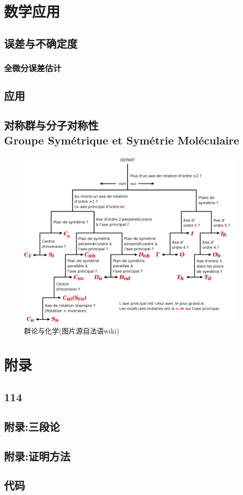\documentclass[12pt, a4paper, oneside]{ctexbook}
\begin{document}
  \part{数学应用}
  \chapter{误差与不确定度}
  \section{全微分误差估计}
  \chapter{应用}  
  \section{}
  \chapter{对称群与分子对称性\\ Groupe Symétrique et Symétrie Moléculaire}
  \begin{figure}[H]%
    \centering
    \includegraphics[scale=0.15]{groupe_chimie.png}
    \caption{群论与化学(图片源自法语wiki)}
    \label{myref:groupechimie}
  \end{figure}

  \part{附录}
  \appendix
  \chapter{114}
  \chapter{附录:三段论}
  \chapter{附录:证明方法}
  \chapter{代码}

  \printindex
\end{document}
